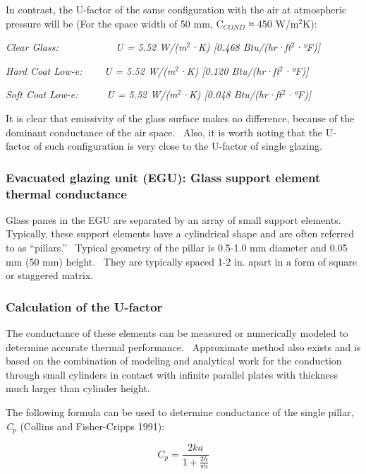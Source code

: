 In contrast, the U-factor of the same configuration with the air at atmospheric pressure will be (For the space width of 50 mm, C\(_{COND}\) ≈ 450 W/m\(^{2}\)K):

\emph{Clear Glass: ~~~~~~~~~~ U = 5.52 W/(m\(^{2}\)·K) {[}0.468 Btu/(hr·ft\(^{2}\)·ºF){]}}

\emph{Hard Coat Low-e: ~~~ U = 5.52 W/(m\(^{2}\)·K) {[}0.120 Btu/(hr·ft\(^{2}\)·ºF){]}}

\emph{Soft Coat Low-e:~~~~~ U = 5.52 W/(m\(^{2}\)·K) {[}0.048 Btu/(hr·ft\(^{2}\)·ºF){]}}

It is clear that emissivity of the glass surface makes no difference, because of the dominant conductance of the air space.~ Also, it is worth noting that the U-factor of such configuration is very close to the U-factor of single glazing.

\subsubsection{Evacuated glazing unit (EGU): Glass support element thermal conductance}\label{evacuated-glazing-unit-egu-glass-support-element-thermal-conductance}

Glass panes in the EGU are separated by an array of small support elements.~ Typically, these support elements have a cylindrical shape and are often referred to as ``pillars.''~ Typical geometry of the pillar is 0.5-1.0 mm diameter and 0.05 mm (50 mm) height.~ They are typically spaced 1-2 in. apart in a form of square or staggered matrix.

\subsubsection{Calculation of the U-factor}\label{calculation-of-the-u-factor}

The conductance of these elements can be measured or numerically modeled to determine accurate thermal performance.~ Approximate method also exists and is based on the combination of modeling and analytical work for the conduction through small cylinders in contact with infinite parallel plates with thickness much larger than cylinder height.

The following formula can be used to determine conductance of the single pillar, \emph{C}\(_{p}\) (Collins and Fisher-Cripps 1991):

\begin{equation}
{C_p} = \frac{{2ka}}{{1 + \frac{{2h}}{{\pi a}}}}
\end{equation}

